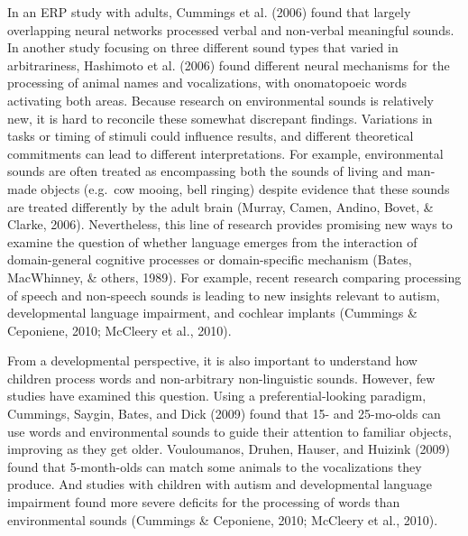 \documentclass[english,floatsintext,man]{apa6}
\theoremstyle{definition}
\theoremstyle{definition}
\theoremstyle{definition}
\theoremstyle{remark}
\begin{document}
In an ERP study with adults, Cummings et al. (2006) found that largely
overlapping neural networks processed verbal and non-verbal meaningful
sounds. In another study focusing on three different sound types that
varied in arbitrariness, Hashimoto et al. (2006) found different neural
mechanisms for the processing of animal names and vocalizations, with
onomatopoeic words activating both areas. Because research on
environmental sounds is relatively new, it is hard to reconcile these
somewhat discrepant findings. Variations in tasks or timing of stimuli
could influence results, and different theoretical commitments can lead
to different interpretations. For example, environmental sounds are
often treated as encompassing both the sounds of living and man-made
objects (e.g.~cow mooing, bell ringing) despite evidence that these
sounds are treated differently by the adult brain (Murray, Camen,
Andino, Bovet, \& Clarke, 2006). Nevertheless, this line of research
provides promising new ways to examine the question of whether language
emerges from the interaction of domain-general cognitive processes or
domain-specific mechanism (Bates, MacWhinney, \& others, 1989). For
example, recent research comparing processing of speech and non-speech
sounds is leading to new insights relevant to autism, developmental
language impairment, and cochlear implants (Cummings \& Ceponiene, 2010;
McCleery et al., 2010).

From a developmental perspective, it is also important to understand how
children process words and non-arbitrary non-linguistic sounds. However,
few studies have examined this question. Using a preferential-looking
paradigm, Cummings, Saygin, Bates, and Dick (2009) found that 15- and
25-mo-olds can use words and environmental sounds to guide their
attention to familiar objects, improving as they get older. Vouloumanos,
Druhen, Hauser, and Huizink (2009) found that 5-month-olds can match
some animals to the vocalizations they produce. And studies with
children with autism and developmental language impairment found more
severe deficits for the processing of words than environmental sounds
(Cummings \& Ceponiene, 2010; McCleery et al., 2010).
\end{document}
